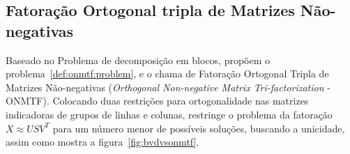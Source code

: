 \documentclass[
    12pt,                %
    oneside,            %
    a4paper,            %
    english,            %
    brazil                %
    ]{abntex2ppgsi}
\newtheorem{theorem}{Teorema}
\begin{document}




\subsection{Fatoração Ortogonal tripla de Matrizes Não-negativas}

Baseado no Problema de decomposição em blocos,  propõem o problema~\ref{def:onmtf:problem}, e o chama de Fatoração Ortogonal Tripla de Matrizes Não-negativas (\textit{Orthogonal Non-negative Matrix Tri-factorization} - ONMTF).
Colocando duas restrições para ortogonalidade nas matrizes indicadoras de grupos de linhas e colunas, restringe o problema da fatoração $X \approx USV^T$ para um número menor de possíveis soluções, buscando a unicidade, assim como mostra a figura~\ref{fig:bvdvsonmtf}.
\end{document}
